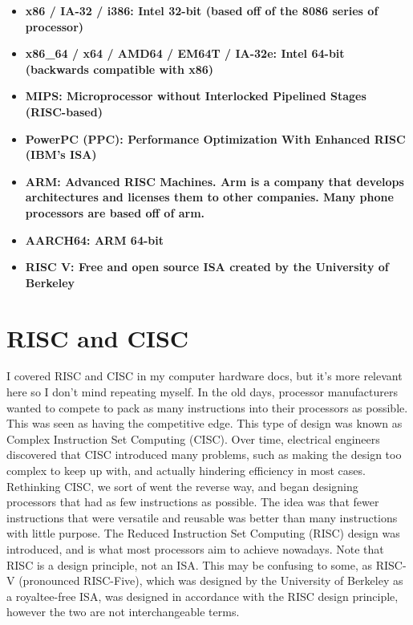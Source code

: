 \documentclass{article}
\begin{document}
\begin{itemize}

   \item{%
      \bfseries{x86 / IA-32 / i386:} \mdseries Intel 32-bit (based off of the 8086 series of processor)
   }

   \item{%
      \bfseries{x86\_64 / x64 / AMD64 / EM64T / IA-32e:} \mdseries Intel 64-bit (backwards compatible with x86)
   }

   \item{%
      \bfseries{MIPS:} \mdseries Microprocessor without Interlocked Pipelined Stages (RISC-based)
   }

   \item{%
      \bfseries{PowerPC (PPC):} \mdseries Performance Optimization With Enhanced RISC (IBM’s ISA)
   }

   \item{%
      \bfseries{ARM:} \mdseries Advanced RISC Machines. Arm is a company that develops architectures and licenses them to other companies. 
      Many phone processors are based off of arm.
   }

   \item{%
      \bfseries{AARCH64:} \mdseries ARM 64-bit
   }

   \item{%
      \bfseries{RISC V:} \mdseries Free and open source ISA created by the University of Berkeley
   }

\end{itemize}

\section{RISC and CISC} 

   I covered RISC and CISC in my computer hardware docs, but it’s more relevant here so I don’t mind repeating 
   myself. In the old days, processor manufacturers wanted to compete to pack as many instructions into their processors as possible. 
   This was seen as having the competitive edge. This type of design was known as Complex Instruction Set Computing (CISC). 
   Over time, electrical engineers discovered that CISC introduced many problems, such as making the design too complex to keep up 
   with, and actually hindering efficiency in most cases. Rethinking CISC, we sort of went the reverse way, and began designing 
   processors that had as few instructions as possible. The idea was that fewer instructions that were versatile and reusable was 
   better than many instructions with little purpose. The Reduced Instruction Set Computing (RISC) design was introduced, and is what most 
   processors aim to achieve nowadays. Note that RISC is a design principle, not an ISA. This may be confusing to 
   some, as RISC-V (pronounced RISC-Five), which was designed by the University of Berkeley as a royaltee-free ISA, was designed in 
   accordance with the RISC design principle, however the two are not interchangeable terms.
\end{document}

